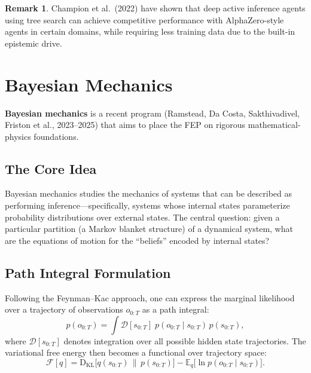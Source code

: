 \documentclass[11pt,a4paper]{article}
\theoremstyle{definition}
\newtheorem{remark}[theorem]{Remark}
\newcommand{\KL}{\mathrm{D}_{\mathrm{KL}}}
\newcommand{\E}{\mathbb{E}}
\newcommand{\cF}{\mathcal{F}}
\begin{document}
\begin{remark}
Champion et al.\ (2022) have shown that deep active inference agents using
tree search can achieve competitive performance with AlphaZero-style agents in
certain domains, while requiring less training data due to the built-in
epistemic drive.
\end{remark}


\section{Bayesian Mechanics}
\label{sec:bayesmech}

\textbf{Bayesian mechanics} is a recent program (Ramstead, Da Costa, Sakthivadivel,
Friston et al., 2023--2025) that aims to place the FEP on rigorous
mathematical-physics foundations.

\subsection{The Core Idea}

Bayesian mechanics studies the mechanics of systems that can be described as
performing inference---specifically, systems whose internal states parameterize
probability distributions over external states.  The central question: given a
particular partition (a Markov blanket structure) of a dynamical system, what
are the equations of motion for the ``beliefs'' encoded by internal states?

\subsection{Path Integral Formulation}

Following the Feynman--Kac approach, one can express the marginal likelihood
over a trajectory of observations $o_{0:T}$ as a path integral:
\begin{equation}
  p(o_{0:T}) = \int \mathcal{D}[s_{0:T}]\;
  p(o_{0:T} \mid s_{0:T})\, p(s_{0:T}),
  \label{eq:path_integral}
\end{equation}
where $\mathcal{D}[s_{0:T}]$ denotes integration over all possible hidden state
trajectories.  The variational free energy then becomes a functional over
trajectory space:
\begin{equation}
  \cF[q] = \KL\bigl[q(s_{0:T}) \,\|\, p(s_{0:T})\bigr]
          - \E_q\bigl[\ln p(o_{0:T} \mid s_{0:T})\bigr].
\end{equation}
\end{document}
